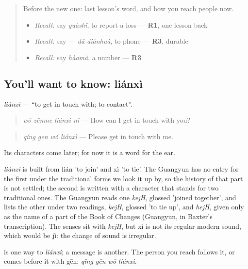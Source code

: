 \label{lesson:ZH-C285-lianxi}



\begin{quote}
Before the new one: last lesson's word, and how you reach people now.

\begin{itemize}
\raggedright
  \item \emph{Recall:} say \emph{guàshī}, to report a loss — \textbf{R1}, one lesson back
  \item \emph{Recall:} say  — \emph{dǎ diànhuà}, to phone — \textbf{R3}, durable
  \item \emph{Recall:} say \emph{hàomǎ}, a number — \textbf{R3}
\end{itemize}
\end{quote}

\subsection*{You'll want to know: liánxì}
\emph{liánxì} — \textquotedblleft{}to get in touch with; to contact\textquotedblright{}.

\begin{quote}
\emph{wǒ zěnme liánxì nǐ} — How can I get in touch with you?
\end{quote}

\begin{quote}
\emph{qǐng gēn wǒ liánxì} — Please get in touch with me.
\end{quote}

Its characters come later; for now it is a word for the ear.

\begin{cousinweb}
\emph{liánxì} is built from lián 'to join' and xì 'to tie'. The Guangyun has no entry for the first under the traditional forms we look it up by, so the history of that part is not settled; the second is written with a character that stands for two traditional ones. The Guangyun reads one \emph{kejH}, glossed 'joined together', and lists the other under two readings, \emph{kejH}, glossed 'to tie up', and \emph{hejH}, given only as the name of a part of the Book of Changes (Guangyun, in Baxter's transcription). The senses sit with \emph{kejH}, but xì is not its regular modern sound, which would be jì: the change of sound is irregular.
\end{cousinweb}

\begin{grammarlens}[title={What you've built}]
 is one way to \emph{liánxì}; a message is another. The person you reach follows it, or comes before it with gēn: \emph{qǐng gēn wǒ liánxì}.
\end{grammarlens}

